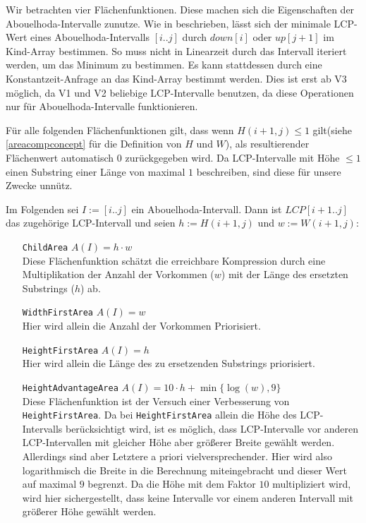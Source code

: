 Wir betrachten vier Flächenfunktionen. Diese machen sich die Eigenschaften der Abouelhoda-Intervalle zunutze. 
Wie in \cite{abouelhoda_optimal_2002} beschrieben, lässt sich der minimale LCP-Wert eines Abouelhoda-Intervalls $[i..j]$ durch $down[i]$ oder $up[j+1]$ im Kind-Array bestimmen. 
So muss nicht in Linearzeit durch das Intervall iteriert werden, um das Minimum zu bestimmen. Es kann stattdessen durch eine Konstantzeit-Anfrage an das Kind-Array bestimmt werden. Dies ist erst ab V3 möglich, da V1 und V2 beliebige LCP-Intervalle benutzen, da diese Operationen nur für Abouelhoda-Intervalle funktionieren.

Für alle folgenden Flächenfunktionen gilt, dass wenn $H(i+1, j) \leq 1$ gilt(siehe \autoref{areacompconcept} für die Definition von $H$ und $W$), als resultierender Flächenwert automatisch $0$ zurückgegeben wird. Da LCP-Intervalle mit Höhe $\leq 1$ einen Substring einer Länge von maximal $1$ beschreiben, sind diese für unsere Zwecke unnütz.  

Im Folgenden sei $I := [i..j]$ ein Abouelhoda-Intervall. Dann ist $LCP[i+1..j]$ das zugehörige LCP-Intervall und seien $h := H(i+1, j)$ und $w := W(i+1, j)$:

\begin{itemize}[leftmargin=3.3cm]
    \item[\texttt{ChildArea}] $A(I) = h \cdot w$\\
    Diese Flächenfunktion schätzt die erreichbare Kompression durch eine Multiplikation der Anzahl der Vorkommen ($w$) mit der Länge des ersetzten Substrings ($h$) ab.
    \item[\texttt{WidthFirstArea}] $A(I) = w$\\ Hier wird allein die Anzahl der Vorkommen Priorisiert.
    \item[\texttt{HeightFirstArea}] $A(I) = h$\\
    Hier wird allein die Länge des zu ersetzenden Substrings priorisiert.
    \item[\texttt{HeightAdvantageArea}] $A(I) = 10 \cdot h + \min\{\log(w), 9\}$\\ Diese Flächenfunktion ist der Versuch einer Verbesserung von \\
    \texttt{HeightFirstArea}. Da bei \texttt{HeightFirstArea} allein die Höhe des LCP-Intervalls berücksichtigt wird, ist es möglich, dass LCP-Intervalle vor anderen LCP-Intervallen mit gleicher Höhe aber größerer Breite gewählt werden. Allerdings sind aber Letztere a priori vielversprechender. Hier wird also logarithmisch die Breite in die Berechnung miteingebracht und dieser Wert auf maximal $9$ begrenzt. Da die Höhe mit dem Faktor $10$ multipliziert wird, wird hier sichergestellt, dass keine Intervalle vor einem anderen Intervall mit größerer Höhe gewählt werden.
\end{itemize}



